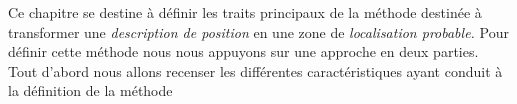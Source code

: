 Ce chapitre se destine à définir les traits principaux de la méthode
destinée à transformer une \emph{description de position} en une zone
de \emph{localisation probable.}
%
Pour définir cette méthode nous nous appuyons sur une approche en deux
parties. Tout d'abord nous allons recenser les différentes
caractéristiques ayant conduit à la définition de la méthode
